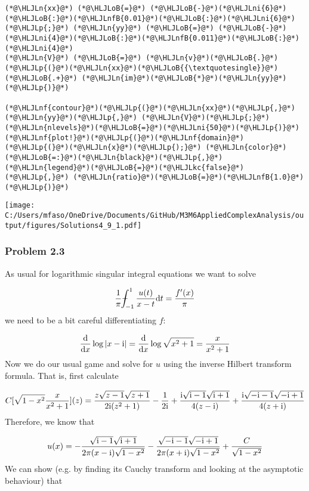\documentclass[12pt,landscape]{article}
\newcommand{\HLJLkc}[1]{\textcolor[RGB]{59,151,46}{\textit{#1}}}
\newcommand{\HLJLn}[1]{#1}
\newcommand{\HLJLnf}[1]{\textcolor[RGB]{66,102,213}{#1}}
\newcommand{\HLJLnfB}[1]{\textcolor[RGB]{59,151,46}{#1}}
\newcommand{\HLJLni}[1]{\textcolor[RGB]{59,151,46}{#1}}
\newcommand{\HLJLoB}[1]{\textcolor[RGB]{102,102,102}{\textbf{#1}}}
\newcommand{\HLJLp}[1]{#1}
\def\D{ {\rm d} }
\def\I{ {\rm i} }
\def\Xint#1{ \mathchoice
   {\XXint\displaystyle\textstyle{#1} }%
   {\XXint\textstyle\scriptstyle{#1} }%
   {\XXint\scriptstyle\scriptscriptstyle{#1} }%
   {\XXint\scriptscriptstyle\scriptscriptstyle{#1} }%
   \!\int}
\def\XXint#1#2#3{ {\setbox0=\hbox{$#1{#2#3}{\int}$}
     \vcenter{\hbox{$#2#3$}}\kern-.5\wd0} }
\def\dashint{\Xint-}
\def\dx{\D x}
\def\dt{\D t}
\begin{document}
{\begin{lstlisting}
(*@\HLJLn{xx}@*) (*@\HLJLoB{=}@*) (*@\HLJLoB{-}@*)(*@\HLJLni{6}@*)(*@\HLJLoB{:}@*)(*@\HLJLnfB{0.01}@*)(*@\HLJLoB{:}@*)(*@\HLJLni{6}@*)(*@\HLJLp{;}@*) (*@\HLJLn{yy}@*) (*@\HLJLoB{=}@*) (*@\HLJLoB{-}@*)(*@\HLJLni{4}@*)(*@\HLJLoB{:}@*)(*@\HLJLnfB{0.011}@*)(*@\HLJLoB{:}@*)(*@\HLJLni{4}@*)
(*@\HLJLn{V}@*) (*@\HLJLoB{=}@*) (*@\HLJLn{v}@*)(*@\HLJLoB{.}@*)(*@\HLJLp{(}@*)(*@\HLJLn{xx}@*)(*@\HLJLoB{{\textquotesingle}}@*) (*@\HLJLoB{.+}@*) (*@\HLJLn{im}@*)(*@\HLJLoB{*}@*)(*@\HLJLn{yy}@*)(*@\HLJLp{)}@*)

(*@\HLJLnf{contour}@*)(*@\HLJLp{(}@*)(*@\HLJLn{xx}@*)(*@\HLJLp{,}@*) (*@\HLJLn{yy}@*)(*@\HLJLp{,}@*) (*@\HLJLn{V}@*)(*@\HLJLp{;}@*) (*@\HLJLn{nlevels}@*)(*@\HLJLoB{=}@*)(*@\HLJLni{50}@*)(*@\HLJLp{)}@*)
(*@\HLJLnf{plot!}@*)(*@\HLJLp{(}@*)(*@\HLJLnf{domain}@*)(*@\HLJLp{(}@*)(*@\HLJLn{x}@*)(*@\HLJLp{);}@*) (*@\HLJLn{color}@*)(*@\HLJLoB{=:}@*)(*@\HLJLn{black}@*)(*@\HLJLp{,}@*) (*@\HLJLn{legend}@*)(*@\HLJLoB{=}@*)(*@\HLJLkc{false}@*)(*@\HLJLp{,}@*) (*@\HLJLn{ratio}@*)(*@\HLJLoB{=}@*)(*@\HLJLnfB{1.0}@*)(*@\HLJLp{)}@*)
\end{lstlisting}

\texttt{[image: C:/Users/mfaso/OneDrive/Documents/GitHub/M3M6AppliedComplexAnalysis/output/figures/Solutions4\_9\_1.pdf]}

\subsubsection{Problem 2.3}
As usual for logarithmic singular integral equations we want to solve

\[
{1 \over \pi} \dashint_{-1}^1 {u(t)  \over x-t} \dt = {f'(x)  \over \pi}
\]
we need to be a bit careful differentiating $f$:

\[
{\D \over \dx} \log|x-\I| = {\D \over \dx} \log\sqrt{x^2 + 1} = { x \over x^2 + 1}
\]
Now we do our usual game and solve for $u$ using the inverse Hilbert transform formula. That is, first calculate

\[
C[\sqrt{1-x^2} {x \over x^2+1}](z) = {z \sqrt{z-1} \sqrt{z+1} \over 2\I (z^2+1)} - {1 \over 2 \I} + {\I \sqrt{\I - 1} \sqrt{\I+1} \over 4 (z-\I)} +  {\I \sqrt{-\I - 1} \sqrt{-\I+1} \over 4 (z+\I)}
\]
Therefore, we know that

\[
u(x) =  -{\sqrt{\I - 1} \sqrt{\I+1} \over 2 \pi (x-\I)\sqrt{1-x^2}} -  {\sqrt{-\I - 1} \sqrt{-\I+1} \over 2 \pi (x+\I) \sqrt{1-x^2}} + {C \over \sqrt{1-x^2}}
\]
We can show (e.g. by finding its Cauchy transform and looking at the asymptotic behaviour) that

}
\end{document}
